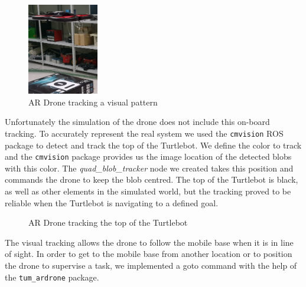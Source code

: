 \documentclass[11pt,a4paper]{article}
\begin{document}
\begin{figure}[ht]
	\centering
    \includegraphics[height=4cm]{visualTracking.png}
    \caption{AR Drone tracking a visual pattern}
    \label{fig:visualTracking}
\end{figure}


Unfortunately the simulation of the drone does not include this on-board tracking. To accurately represent the real system we used the \verb!cmvision! ROS package to detect and track the top of the Turtlebot. We define the color to track and the \verb!cmvision! package provides us the image location of the detected blobs with this color. The \textit{quad\_blob\_tracker} node we created takes this position and commands the drone to keep the blob centred. The top of the Turtlebot is black, as well as other elements in the simulated world, but the tracking proved to be reliable when the Turtlebot is navigating to a defined goal.


\begin{figure}[ht!]%
	\centering
    \qquad  
    \caption{AR Drone tracking the top of the Turtlebot}
    \label{fig:simTracking}
\end{figure}


The visual tracking allows the drone to follow the mobile base when it is in line of sight. In order to get to the mobile base from another location or to position the drone to supervise a task, we implemented a goto command with the help of the \verb!tum_ardrone! package.
\end{document}
